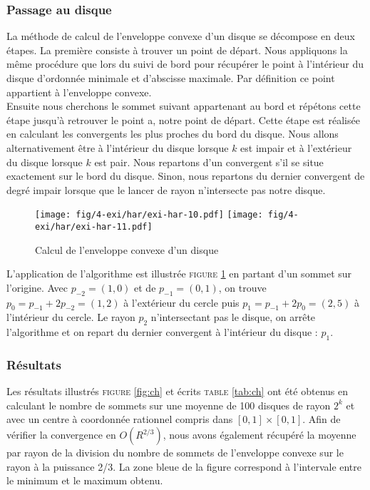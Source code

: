 \subsubsection{Passage au disque}


La méthode de calcul de l'enveloppe convexe d'un disque se décompose en deux étapes. La première consiste à trouver un point de départ. Nous appliquons la même procédure que lors du suivi de bord pour récupérer le point à l'intérieur du disque d'ordonnée minimale et d'abscisse maximale. Par définition ce point appartient à l'enveloppe convexe.\\

Ensuite nous cherchons le sommet suivant appartenant au bord et répétons cette étape jusqu'à retrouver le point a, notre point de départ. Cette étape est réalisée en calculant les convergents les plus proches du bord du disque. Nous allons alternativement être à l'intérieur du disque lorsque $k$ est impair et à l'extérieur du disque lorsque $k$ est pair. Nous repartons d'un convergent s'il se situe exactement sur le bord du disque. Sinon, nous repartons du dernier convergent de degré impair lorsque que le lancer de rayon n'intersecte pas notre disque.\\

\begin{figure}[H]
  \centering
  \texttt{[image: fig/4-exi/har/exi-har-10.pdf]}
  \texttt{[image: fig/4-exi/har/exi-har-11.pdf]}
  \caption{Calcul de l'enveloppe convexe d'un disque}
\label{fig:disque-conv}  
\end{figure}

L'application de l'algorithme est illustrée \textsc{figure} \ref{fig:disque-conv} en partant d'un sommet sur l'origine. Avec $p_{-2} = (1,0)$ et de $p_{-1} = (0,1)$, on trouve $p_{0} = p_{-1} + 2p_{-2} = (1,2)$ à l'extérieur du cercle puis $p_{1} = p_{-1} + 2p_{0} = (2,5)$ à l'intérieur du cercle. Le rayon $p_{2}$ n'intersectant pas le disque, on arrête l'algorithme et on repart du dernier convergent à l'intérieur du disque : $p_{1}$.

\subsubsection{Résultats}

Les résultats illustrés \textsc{figure} \ref{fig:ch} et écrits \textsc{table} \ref{tab:ch} ont été obtenus en calculant le nombre de sommets sur une moyenne de 100 disques de rayon $2^k$ et avec un centre à coordonnée rationnel compris dans $[0,1]\times[0,1]$. Afin de vérifier la convergence en $O(R^{2/3})$, nous avons également récupéré la moyenne par rayon de la division du nombre de sommets de l'enveloppe convexe sur le rayon à la puissance 2/3. La zone bleue de la figure correspond à l'intervale entre le minimum et le maximum obtenu.

